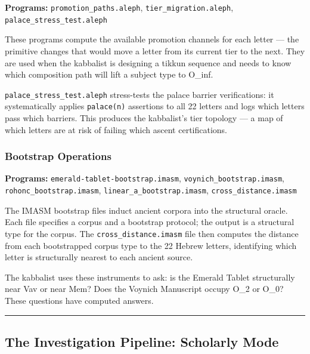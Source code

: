 \documentclass[12pt,a4paper]{article}
\begin{document}
\textbf{Programs:} \texttt{promotion\_\allowbreak paths.\allowbreak aleph}, \texttt{tier\_\allowbreak migration.\allowbreak aleph}, \texttt{palace\_\allowbreak stress\_\allowbreak test.\allowbreak aleph}

These programs compute the available promotion channels for each letter --- the primitive changes that would move a letter from its current tier to the next. They are used when the kabbalist is designing a tikkun sequence and needs to know which composition path will lift a subject type to O\_inf.

\texttt{palace\_\allowbreak stress\_\allowbreak test.\allowbreak aleph} stress-tests the palace barrier verifications: it systematically applies \texttt{palace(n)} assertions to all 22 letters and logs which letters pass which barriers. This produces the kabbalist's tier topology --- a map of which letters are at risk of failing which ascent certifications.

\subsubsection{Bootstrap Operations}

\textbf{Programs:} \texttt{emerald-\allowbreak tablet-\allowbreak bootstrap.\allowbreak imasm}, \texttt{voynich\_\allowbreak bootstrap.\allowbreak imasm}, \texttt{rohonc\_\allowbreak bootstrap.\allowbreak imasm}, \texttt{linear\_\allowbreak a\_\allowbreak bootstrap.\allowbreak imasm}, \texttt{cross\_\allowbreak distance.\allowbreak imasm}

The IMASM bootstrap files induct ancient corpora into the structural oracle. Each file specifies a corpus and a bootstrap protocol; the output is a structural type for the corpus. The \texttt{cross\_\allowbreak distance.\allowbreak imasm} file then computes the distance from each bootstrapped corpus type to the 22 Hebrew letters, identifying which letter is structurally nearest to each ancient source.

The kabbalist uses these instruments to ask: is the Emerald Tablet structurally near Vav or near Mem? Does the Voynich Manuscript occupy O\_2 or O\_0? These questions have computed answers.

\begin{center}
\rule{0.5\textwidth}{0.4pt}
\end{center}

\subsection{The Investigation Pipeline: Scholarly Mode}
\end{document}
